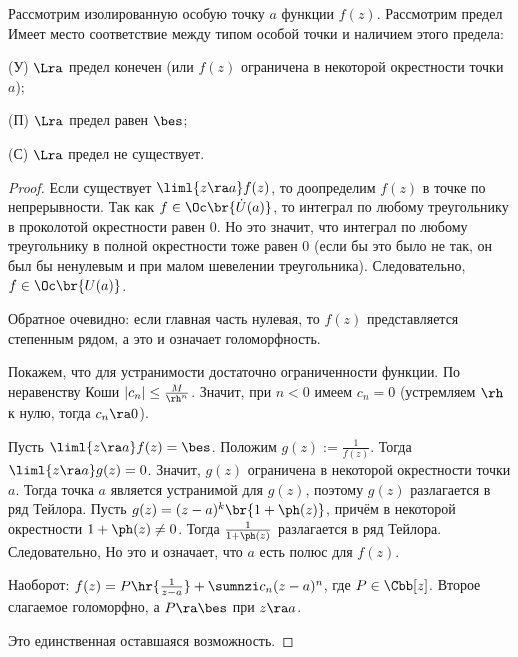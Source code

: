 \documentclass[a4paper]{article}
\begin{document}
\begin{theorem}
Рассмотрим изолированную особую точку $a$ функции $f(z)$. Рассмотрим предел
Имеет место соответствие между типом особой точки и наличием этого предела:
\begin{items}{-2}
\item[(У)] $\Lra$ предел конечен (или $f(z)$ ограничена в некоторой окрестности точки $a$);
\item[(П)] $\Lra$ предел равен $\bes$;
\item[(С)] $\Lra$ предел не существует.
\end{items}
\end{theorem}
\begin{proof}
 Если существует $\liml{z\ra a}f(z)$, то доопределим $f(z)$ в точке по непрерывности.
Так как $f \in \Oc\br{\dot U(a)}$, то интеграл по любому треугольнику в проколотой окрестности равен $0$.
Но это значит, что интеграл по любому треугольнику в полной окрестности тоже равен $0$ (если бы это было не так,
он был бы ненулевым и при малом шевелении треугольника). Следовательно, $f\in\Oc\br{U(a)}$.

Обратное очевидно: если главная часть нулевая, то $f(z)$ представляется степенным рядом, а это и означает голоморфность.

Покажем, что для устранимости достаточно ограниченности функции. По неравенству Коши $|c_n|\le \frac{M}{\rh^n}$.
Значит, при $n < 0$ имеем $c_n=0$ (устремляем $\rh$ к нулю, тогда $c_n \ra 0$).

 Пусть $\liml{z\ra a}f(z)=\bes$. Положим $g(z) := \frac{1}{f(z)}$. Тогда $\liml{z\ra a}g(z)=0$. Значит, $g(z)$ ограничена
в некоторой окрестности точки $a$. Тогда точка $a$ является устранимой для $g(z)$, поэтому $g(z)$ разлагается в ряд Тейлора.
Пусть $g(z) = (z-a)^k\br{1 + \ph(z)}$, причём в некоторой окрестности $1+\ph(z) \neq 0$. Тогда $\frac{1}{1+\ph(z)}$ разлагается
в ряд Тейлора. Следовательно,
Но это и означает, что $a$ есть полюс для $f(z)$.

Наоборот: $f(z) = P\hr{\frac{1}{z-a}} + \sumnzi c_n (z-a)^n$, где $P \in \Cbb[z]$. Второе слагаемое голоморфно, а $P\ra \bes$ при $z\ra a$.

 Это единственная оставшаяся возможность.
\end{proof}
\end{document}
